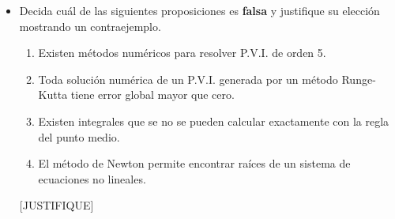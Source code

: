 \documentclass[11pt]{article}
\newcommand{\buena}{[BUENA]}
\newcommand{\justifique}{[JUSTIFIQUE]}
\begin{document}
\begin{itemize}
\item Decida cu\'al de las siguientes proposiciones es \textbf{falsa} y justifique su elecci\'on mostrando un contraejemplo.
\begin{enumerate}
	\item Existen m\'etodos num\'ericos para resolver P.V.I. de orden 5.
    \item \buena Toda soluci\'on num\'erica de un P.V.I. generada por un m\'etodo Runge-Kutta tiene error global mayor que cero.
    \item Existen integrales que se no se pueden calcular exactamente con la regla del punto medio.
    \item El método de Newton permite encontrar ra\'ices de un sistema de ecuaciones no lineales.
\end{enumerate}
\justifique

\end{itemize}
\end{document}
